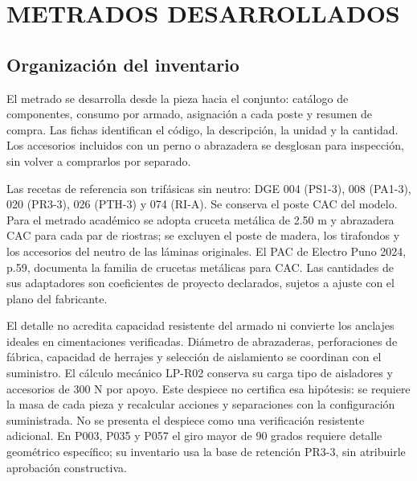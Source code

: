 \chapter{METRADOS DESARROLLADOS}
\section{Organización del inventario}
El metrado se desarrolla desde la pieza hacia el conjunto: catálogo de componentes,
consumo por armado, asignación a cada poste y resumen de compra. Las fichas identifican
el código, la descripción, la unidad y la cantidad. Los accesorios incluidos con un
perno o abrazadera se desglosan para inspección, sin volver a comprarlos por separado.

Las recetas de referencia son trifásicas sin neutro: DGE 004 (PS1-3), 008 (PA1-3),
020 (PR3-3), 026 (PTH-3) y 074 (RI-A). Se conserva el poste CAC del modelo. Para
el metrado académico se adopta cruceta metálica de 2.50 m y abrazadera CAC para
cada par de riostras; se excluyen el poste de madera, los tirafondos y los accesorios
del neutro de las láminas originales. El PAC de Electro Puno 2024, p.59, documenta
la familia de crucetas metálicas para CAC. Las cantidades de sus adaptadores son
coeficientes de proyecto declarados, sujetos a ajuste con el plano del fabricante.

El detalle no acredita capacidad resistente del armado ni convierte los anclajes
ideales en cimentaciones verificadas. Diámetro de abrazaderas, perforaciones de
fábrica, capacidad de herrajes y selección de aislamiento se coordinan con el suministro.
El cálculo mecánico LP-R02 conserva su carga tipo de aisladores y accesorios de 300 N
por apoyo. Este despiece no certifica esa hipótesis: se requiere la masa de cada pieza
y recalcular acciones y separaciones con la configuración suministrada. No se presenta
el despiece como una verificación resistente adicional.
En P003, P035 y P057 el giro mayor de 90 grados requiere detalle geométrico específico;
su inventario usa la base de retención PR3-3, sin atribuirle aprobación constructiva.

